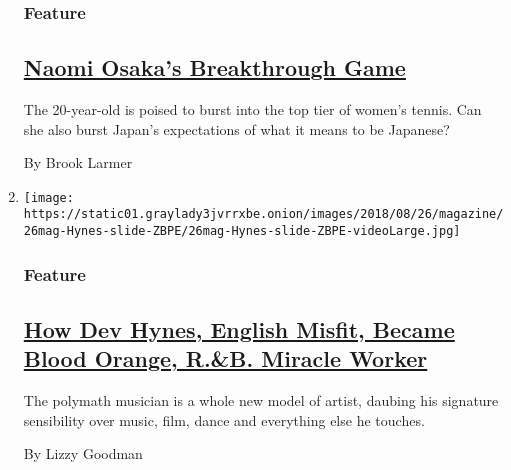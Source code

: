 \begin{enumerate}
  \hypertarget{feature-2}{%
  \subsubsection{Feature}\label{feature-2}}

  \hypertarget{naomi-osakas-breakthrough-game}{%
  \subsection{\texorpdfstring{\href{/2018/08/23/magazine/naomi-osakas-breakthrough-game.html}{Naomi
  Osaka's Breakthrough
  Game}}{Naomi Osaka's Breakthrough Game}}\label{naomi-osakas-breakthrough-game}}

  The 20-year-old is poised to burst into the top tier of women's
  tennis. Can she also burst Japan's expectations of what it means to be
  Japanese?

  By Brook Larmer
\item
  \texttt{[image: https://static01.graylady3jvrrxbe.onion/images/2018/08/26/magazine/26mag-Hynes-slide-ZBPE/26mag-Hynes-slide-ZBPE-videoLarge.jpg]}

  \hypertarget{feature-3}{%
  \subsubsection{Feature}\label{feature-3}}

  \hypertarget{how-dev-hynes-english-misfit-became-blood-orange-rb-miracle-worker}{%
  \subsection{\texorpdfstring{\href{/2018/08/23/magazine/dev-hynes-blood-orange-music.html}{How
  Dev Hynes, English Misfit, Became Blood Orange, R.\&B. Miracle
  Worker}}{How Dev Hynes, English Misfit, Became Blood Orange, R.\&B. Miracle Worker}}\label{how-dev-hynes-english-misfit-became-blood-orange-rb-miracle-worker}}

  The polymath musician is a whole new model of artist, daubing his
  signature sensibility over music, film, dance and everything else he
  touches.

  By Lizzy Goodman
\end{enumerate}

